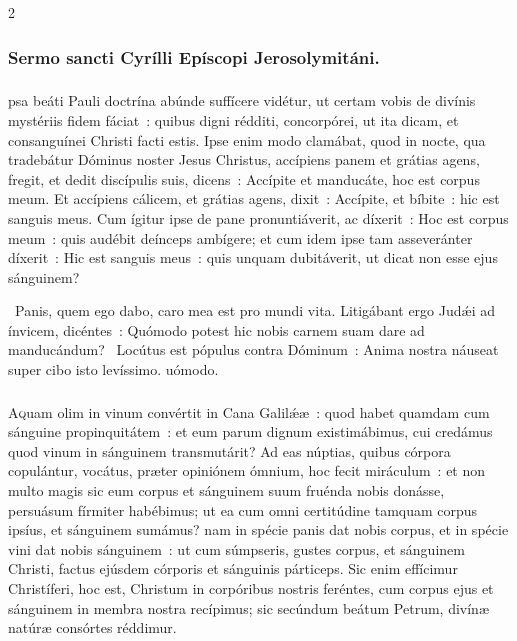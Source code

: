 \documentclass[9pt,twoside]{extarticle}
\begin{document}
\begin{multicols}{2}
{{\subsubsection*{\center Sermo sancti Cyrílli Epíscopi Jerosolymitáni.}
\subsubsection*{\center {}}
psa beáti Pauli doctrína abúnde suffícere vidétur, ut certam vobis de divínis mystériis fidem fáciat~: quibus digni rédditi, concorpórei, ut ita dicam, et consanguínei Christi facti estis. Ipse enim modo clamábat, quod in nocte, qua tradebátur Dóminus noster Jesus Christus, accípiens panem et grátias agens, fregit, et dedit discípulis suis, dicens~: Accípite et manducáte, hoc est corpus meum. Et accípiens cálicem, et grátias agens, dixit~: Accípite, et bíbite~: hic est sanguis meus. Cum ígitur ipse de pane pronuntiáverit, ac díxerit~: Hoc est corpus meum~: quis audébit deínceps ambígere; et cum idem ipse tam asseveránter díxerit~: Hic est sanguis meus~: quis unquam dubitáverit, ut dicat non esse ejus sánguinem?

\begin{tightlist}{}
~Panis, quem ego dabo, caro mea est pro mundi vita. Litigábant ergo Judǽi ad ínvicem, dicéntes~: \textred{*} Quómodo potest hic nobis carnem suam dare ad manducándum? ~Locútus est pópulus contra Dóminum~: Anima nostra náuseat super cibo isto levíssimo. uómodo.
\end{tightlist}

\subsubsection*{\center {}}
\lettrine{A}quam olim in vinum convértit in Cana Galilǽæ~: quod habet quamdam cum sánguine propinquitátem~: et eum parum dignum existimábimus, cui credámus quod vinum in sánguinem transmutárit? Ad eas núptias, quibus córpora copulántur, vocátus, præter opiniónem ómnium, hoc fecit miráculum~: et non multo magis sic eum corpus et sánguinem suum fruénda nobis donásse, persuásum fírmiter habébimus; ut ea cum omni certitúdine tamquam corpus ipsíus, et sánguinem sumámus? nam in spécie panis dat nobis corpus, et in spécie vini dat nobis sánguinem~: ut cum súmpseris, gustes corpus, et sánguinem Christi, factus ejúsdem córporis et sánguinis párticeps. Sic enim effícimur Christíferi, hoc est, Christum in corpóribus nostris feréntes, cum corpus ejus et sánguinem in membra nostra recípimus; sic secúndum beátum Petrum, divínæ natúræ consórtes réddimur. 

}}
\end{multicols}
\end{document}
